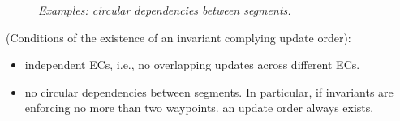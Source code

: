 \begin{figure}[!th]
  \caption{\em \small Examples: circular dependencies between segments.}
  \label{fig:circular}
\end{figure}

\begin{theorem} (Conditions of the existence of an invariant complying update order): 
\begin{itemize}[noitemsep,topsep=0pt,leftmargin=*]
\item independent ECs, i.e., no overlapping updates across different ECs.
\item no circular dependencies between segments. 
In particular, if invariants are enforcing no more than two waypoints.
an update order always exists. 
\end{itemize} 
\end{theorem}


